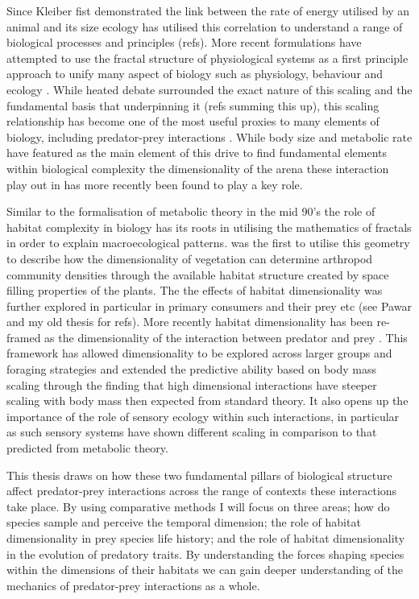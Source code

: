 Since Kleiber fist demonstrated the link between the rate of energy utilised by an animal and its size \citep{kleiber1947body} ecology has utilised this correlation to understand a range of biological processes and principles (refs). More recent formulations have attempted to use the fractal structure of physiological systems as a first principle approach to unify many aspect of biology such as physiology, behaviour and ecology \citep{west1997general,brown2004}. While heated debate surrounded the exact nature of this scaling and the fundamental basis that underpinning it (refs summing this up), this scaling relationship has become one of the most useful proxies to many elements of biology, including predator-prey interactions \citep{brown2004}. While body size and metabolic rate have featured as the main element of this drive to find fundamental elements within biological complexity the dimensionality of the arena these interaction play out in has more recently been found to play a key role.


Similar to the formalisation of metabolic theory in the mid 90's the role of habitat complexity in biology has its roots in utilising the mathematics of fractals in order to explain macroecological patterns. \cite{morse1985fractal} was the first to utilise this geometry to describe how the dimensionality of vegetation can determine arthropod community densities through the available habitat structure created by space filling properties of the plants. The the effects of habitat dimensionality was further explored in particular in primary consumers and their prey etc (see Pawar and my old thesis for refs). More recently habitat dimensionality has been re-framed as the dimensionality of the interaction between predator and prey \citep{pawar2012dimensionality}. This framework has allowed dimensionality to be explored across larger groups and foraging strategies and extended the predictive ability based on body mass scaling through the finding that high dimensional interactions have steeper scaling with body mass then expected from standard theory. It also opens up the importance of the role of sensory ecology within such interactions, in particular as such sensory systems have shown different scaling in comparison to that predicted from metabolic theory. %


This thesis draws on how these two fundamental pillars of biological structure affect predator-prey interactions across the range of contexts these interactions take place. By using comparative methods I will focus on three areas; how do species sample and perceive the temporal dimension; the role of habitat dimensionality in prey species life history; and the role of habitat dimensionality in the evolution of predatory traits. By understanding the forces shaping species within the dimensions of their habitats we can gain deeper understanding of the mechanics of predator-prey interactions as a whole.\\


